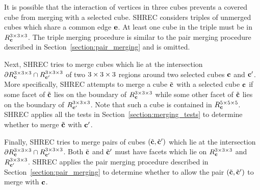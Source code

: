 It is possible that the interaction of vertices in three cubes
prevents a covered cube from merging with a selected cube.
SHREC considers triples of unmerged cubes
which share a common edge $\mathbf{e}$.
At least one cube in the triple must be in $R^{3 \times 3 \times 3}_{\mathbf{c}}$.
The triple merging procedure is similar to the pair merging procedure
described in Section~\ref{section:pair_merging} and is omitted.

Next, SHREC tries to merge cubes which lie 
at the intersection $\partial R^{3 \times 3 \times 3}_{\mathbf{c}} \cap R^{3 \times 3 \times 3}_{\mathbf{c}'}$
of two $3 \times 3 \times 3$ regions around two selected cubes $\mathbf{c}$ and $\mathbf{c}'$.
More specifically, SHREC attempts to merge a cube ${\tilde{\mathbf{c}}}$ 
with a selected cube $\mathbf{c}$ if some facet of ${\tilde{\mathbf{c}}}$ lies 
on the boundary of $R^{3 \times 3 \times 3}_{\mathbf{c}}$ 
while some other facet of ${\tilde{\mathbf{c}}}$ lies on the boundary of $R^{3 \times 3 \times 3}_{\mathbf{c}'}$.
Note that such a cube is contained in $R^{5 \times 5 \times 5}_{\mathbf{c}}$.
SHREC applies all the tests in Section~\ref{section:merging_tests}
to determine whether to merge ${\tilde{\mathbf{c}}}$ with $\mathbf{c}'$.

Finally, SHREC tries to merge pairs of cubes $({\tilde{\mathbf{c}}}, {\tilde{\mathbf{c}}}')$ which lie
at the intersection $\partial R^{3 \times 3 \times 3}_{\mathbf{c}} \cap R^{3 \times 3 \times 3}_{\mathbf{c}'}$.
Both ${\tilde{\mathbf{c}}}$ and ${\tilde{\mathbf{c}}}'$ must have facets which lie on $R^{3 \times 3 \times 3}_{\mathbf{c}}$
and $R^{3 \times 3 \times 3}_{\mathbf{c}'}$.
SHREC applies the pair merging procedure described 
in Section~\ref{section:pair_merging} to determine whether
to allow the pair $({\tilde{\mathbf{c}}},{\tilde{\mathbf{c}}}')$ to merge with $\mathbf{c}$.


